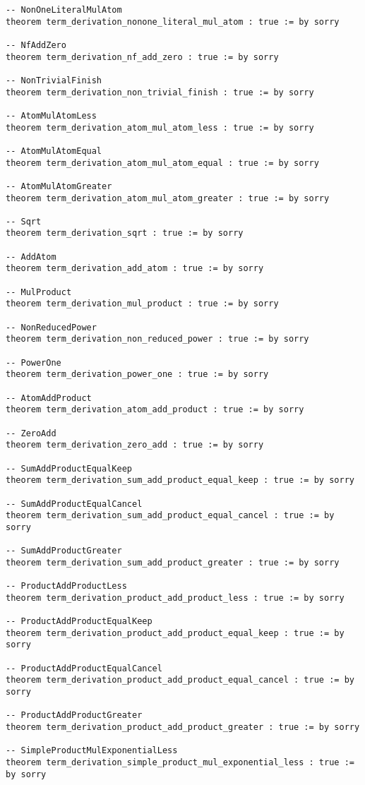 \documentclass{article}
\begin{document}
\begin{tcolorbox}[colback=white!10, width=\linewidth]
\begin{lstlisting}[language=Lean4]
-- NonOneLiteralMulAtom
theorem term_derivation_nonone_literal_mul_atom : true := by sorry

-- NfAddZero
theorem term_derivation_nf_add_zero : true := by sorry

-- NonTrivialFinish
theorem term_derivation_non_trivial_finish : true := by sorry

-- AtomMulAtomLess
theorem term_derivation_atom_mul_atom_less : true := by sorry

-- AtomMulAtomEqual
theorem term_derivation_atom_mul_atom_equal : true := by sorry

-- AtomMulAtomGreater
theorem term_derivation_atom_mul_atom_greater : true := by sorry

-- Sqrt
theorem term_derivation_sqrt : true := by sorry

-- AddAtom
theorem term_derivation_add_atom : true := by sorry

-- MulProduct
theorem term_derivation_mul_product : true := by sorry

-- NonReducedPower
theorem term_derivation_non_reduced_power : true := by sorry

-- PowerOne
theorem term_derivation_power_one : true := by sorry

-- AtomAddProduct
theorem term_derivation_atom_add_product : true := by sorry

-- ZeroAdd
theorem term_derivation_zero_add : true := by sorry

-- SumAddProductEqualKeep
theorem term_derivation_sum_add_product_equal_keep : true := by sorry

-- SumAddProductEqualCancel
theorem term_derivation_sum_add_product_equal_cancel : true := by sorry

-- SumAddProductGreater
theorem term_derivation_sum_add_product_greater : true := by sorry

-- ProductAddProductLess
theorem term_derivation_product_add_product_less : true := by sorry

-- ProductAddProductEqualKeep
theorem term_derivation_product_add_product_equal_keep : true := by sorry

-- ProductAddProductEqualCancel
theorem term_derivation_product_add_product_equal_cancel : true := by sorry

-- ProductAddProductGreater
theorem term_derivation_product_add_product_greater : true := by sorry

-- SimpleProductMulExponentialLess
theorem term_derivation_simple_product_mul_exponential_less : true := by sorry


\end{lstlisting}
\end{tcolorbox}
\end{document}
